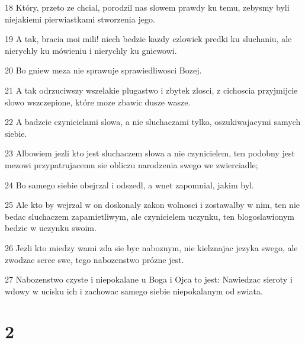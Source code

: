 \par 18 Który, przeto ze chcial, porodzil nas slowem prawdy ku temu, zebysmy byli niejakiemi pierwiastkami stworzenia jego.
\par 19 A tak, bracia moi mili! niech bedzie kazdy czlowiek predki ku sluchaniu, ale nierychly ku mówieniu i nierychly ku gniewowi.
\par 20 Bo gniew meza nie sprawuje sprawiedliwosci Bozej.
\par 21 A tak odrzuciwszy wszelakie plugastwo i zbytek zlosci, z cichoscia przyjmijcie slowo wszczepione, które moze zbawic dusze wasze.
\par 22 A badzcie czynicielami slowa, a nie sluchaczami tylko, oszukiwajacymi samych siebie.
\par 23 Albowiem jezli kto jest sluchaczem slowa a nie czynicielem, ten podobny jest mezowi przypatrujacemu sie obliczu narodzenia swego we zwierciadle;
\par 24 Bo samego siebie obejrzal i odszedl, a wnet zapomnial, jakim byl.
\par 25 Ale kto by wejrzal w on doskonaly zakon wolnosci i zostawalby w nim, ten nie bedac sluchaczem zapamietliwym, ale czynicielem uczynku, ten blogoslawionym bedzie w uczynku swoim.
\par 26 Jezli kto miedzy wami zda sie byc naboznym, nie kielznajac jezyka swego, ale zwodzac serce swe, tego nabozenstwo prózne jest.
\par 27 Nabozenstwo czyste i niepokalane u Boga i Ojca to jest: Nawiedzac sieroty i wdowy w ucisku ich i zachowac samego siebie niepokalanym od swiata.

\chapter{2}

